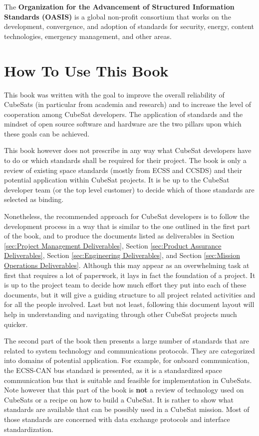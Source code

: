 The \textbf{Organization for the Advancement of Structured Information Standards (OASIS)} \cite{oasis.org} is a global non-profit consortium that works on the development, convergence, and adoption of standards for security, energy, content technologies, emergency management, and other areas.

\section{How To Use This Book}

This book was written with the goal to improve the overall reliability of CubeSats (in particular from academia and research) and to increase the level of cooperation among CubeSat developers. The application of standards and the mindset of open source software and hardware are the two pillars upon which these goals can be achieved.

This book however does not prescribe in any way what CubeSat developers have to do or which standards shall be required for their project. The book is only a review of existing space standards (mostly from ECSS and CCSDS) and their potential application within CubeSat projects. It is be up to the CubeSat developer team (or the top level customer) to decide which of those standards are selected as binding.

Nonetheless, the recommended approach for CubeSat developers is to follow the development process in a way that is similar to the one outlined in the first part of the book, and to produce the documents listed as deliverables in Section \ref{sec:Project Management Deliverables}, Section \ref{sec:Product Assurance Deliverables}, Section \ref{sec:Engineering Deliverables}, and Section \ref{sec:Mission Operations Deliverables}. Although this may appear as an overwhelming task at first that requires a lot of paperwork, it lays in fact the foundation of a project. It is up to the project team to decide how much effort they put into each of these documents, but it will give a guiding structure to all project related activities and for all the people involved. Last but not least, following this document layout will help in understanding and navigating through other CubeSat projects much quicker.

The second part of the book then presents a large number of standards that are related to system technology and communications protocols. They are categorized into domains of potential application. For example, for onboard communication, the ECSS-CAN bus standard is presented, as it is a standardized space communication bus that is suitable and feasible for implementation in CubeSats. Note however that this part of the book is \textbf{not} a review of technology used on CubeSats or a recipe on how to build a CubeSat. It is rather to show what standards are available that can be possibly used in a CubeSat mission. Most of those standards are concerned with data exchange protocols and interface standardization.